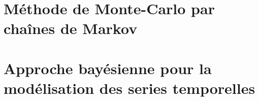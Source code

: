 \documentclass{presentation_template}
\begin{document}
\section{Méthode de Monte-Carlo par chaînes de Markov}




\section{Approche bayésienne pour la modélisation des series temporelles}
\end{document}
